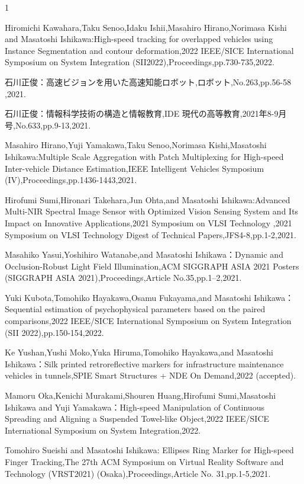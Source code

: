 \begin{査読付}{1}


Hiromichi Kawahara,Taku Senoo,Idaku Ishii,Masahiro Hirano,Norimasa Kishi and Masatoshi Ishikawa:High-speed tracking for overlapped vehicles using Instance Segmentation and contour deformation,2022 IEEE/SICE International Symposium on System Integration (SII2022),Proceedings,pp.730-735,2022.

石川正俊：高速ビジョンを用いた高速知能ロボット,ロボット,No.263,pp.56-58 ,2021.

石川正俊：情報科学技術の構造と情報教育,IDE 現代の高等教育,2021年8-9月号,No.633,pp.9-13,2021.

Masahiro Hirano,Yuji Yamakawa,Taku Senoo,Norimasa Kishi,Masatoshi Ishikawa:Multiple Scale Aggregation with Patch Multiplexing for High-speed Inter-vehicle Distance Estimation,IEEE Intelligent Vehicles Symposium (IV),Proceedings,pp.1436-1443,2021.

Hirofumi Sumi,Hironari Takehara,Jun Ohta,and Masatoshi Ishikawa:Advanced Multi-NIR Spectral Image Sensor with Optimized Vision Sensing System and Its Impact on Innovative Applications,2021 Symposium on VLSI Technology ,2021 Symposium on VLSI Technology Digest of Technical Papers,JFS4-8,pp.1-2,2021.

Masahiko Yasui,Yoshihiro Watanabe,and Masatoshi Ishikawa：Dynamic and Occlusion-Robust Light Field Illumination,ACM SIGGRAPH ASIA 2021 Posters (SIGGRAPH ASIA 2021),Proceedings,Article No.35,pp.1–2,2021.

Yuki Kubota,Tomohiko Hayakawa,Osamu Fukayama,and Masatoshi Ishikawa：Sequential estimation of psychophysical parameters based on the paired comparisons,2022 IEEE/SICE International Symposium on System Integration (SII 2022),pp.150-154,2022.

Ke Yushan,Yushi Moko,Yuka Hiruma,Tomohiko Hayakawa,and Masatoshi Ishikawa：Silk printed retroreflective markers for infrastructure maintenance vehicles in tunnels,SPIE Smart Structures + NDE On Demand,2022 (accepted).

Mamoru Oka,Kenichi Murakami,Shouren Huang,Hirofumi Sumi,Masatoshi Ishikawa and Yuji Yamakawa：High-speed Manipulation of Continuous Spreading and Aligning a Suspended Towel-like Object,2022 IEEE/SICE International Symposium on System Integration,2022.

Tomohiro Sueishi and Masatoshi Ishikawa:  Ellipses Ring Marker for High-speed Finger Tracking,The 27th ACM Symposium on Virtual Reality Software and Technology (VRST2021) (Osaka),Proceedings,Article No. 31,pp.1-5,2021.



\end{査読付}
